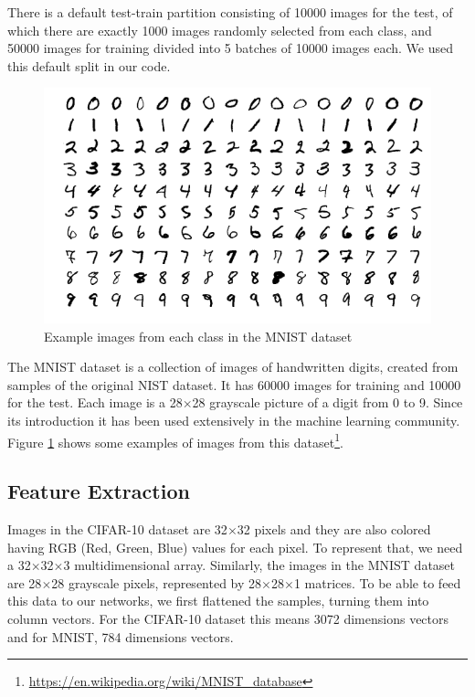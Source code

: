 \documentclass[conference]{IEEEtran}
\begin{document}
There is a default test-train partition consisting of 10000 images for the test, of which there are exactly 1000 images randomly selected from each class, and 50000 images for training divided into 5 batches of 10000 images each. We used this default split in our code.

\begin{figure}[]
\centering
\includegraphics[scale = 0.35]{figs/mnist.png}
\caption{Example images from each class in the MNIST dataset}
\label{fig:mnist}
\end{figure}

The MNIST dataset is a collection of images of handwritten digits, created from samples of the original NIST dataset. It has 60000 images for training and 10000 for the test. Each image is a 28$\times$28 grayscale picture of a digit from 0 to 9. Since its introduction\cite{lecun1998gradient} it has been used extensively in the machine learning community. Figure \ref{fig:mnist} shows some examples of images from this dataset\footnote{\url{https://en.wikipedia.org/wiki/MNIST\_database}}.

\subsection{Feature Extraction}

Images in the CIFAR-10 dataset are 32$\times$32 pixels and they are also colored having RGB (Red, Green, Blue) values for each pixel. To represent that, we need a 32$\times$32$\times$3 multidimensional array. Similarly, the images in the MNIST dataset are 28$\times$28 grayscale pixels, represented by 28$\times$28$\times$1 matrices. To be able to feed this data to our networks, we first flattened the samples, turning them into column vectors. For the CIFAR-10 dataset this means 3072 dimensions vectors and for MNIST, 784 dimensions vectors. 
\end{document}
